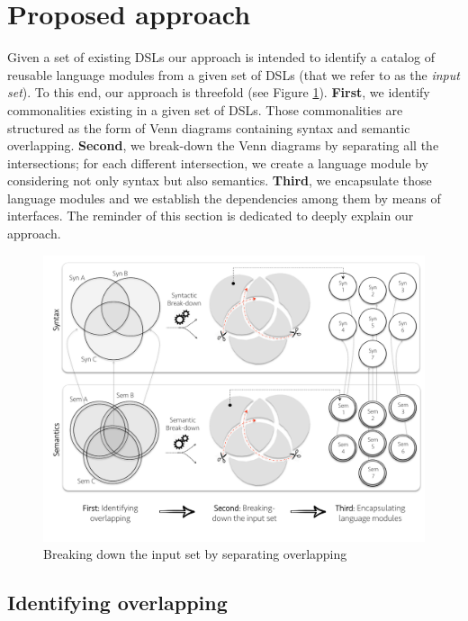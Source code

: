 \section{Proposed approach}
\label{sec:apprach}

Given a set of existing DSLs  our approach is intended to identify a catalog of reusable language modules from a given set of DSLs (that we refer to as the \textit{input set}). To this end, our approach is threefold (see Figure \ref{fig:breakingdown}). \textbf{First}, we identify commonalities existing in a given set of DSLs. Those commonalities are structured as the form of Venn diagrams containing syntax and semantic overlapping. \textbf{Second}, we break-down the Venn diagrams by separating all the intersections; for each different intersection, we create a language module by considering not only syntax but also semantics. \textbf{Third}, we encapsulate those language modules and we establish the dependencies among them by means of interfaces. The reminder of this section is dedicated to deeply explain our approach. 

\begin{figure}
\centering
\includegraphics[width=1\linewidth]{images/breakdown.pdf}
\caption{Breaking down the input set by separating overlapping}
\label{fig:breakingdown}
\end{figure}

\subsection{Identifying overlapping}
\label{sec:metrics}

